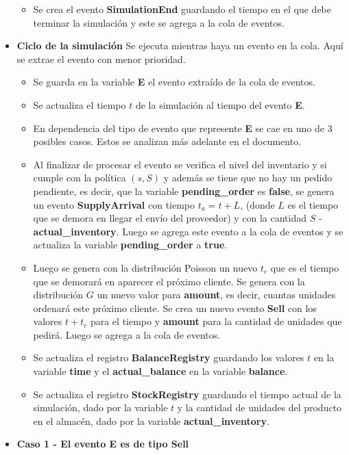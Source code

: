 \documentclass{article}
\begin{document}
\begin{itemize}
\begin{itemize}
        \item Se crea el evento \textbf{SimulationEnd} guardando el tiempo en el que debe terminar la simulación y este se agrega a la cola de eventos.
    \end{itemize}
    \item \textbf{Ciclo de la simulación} Se ejecuta mientras haya un evento en la cola. Aquí se extrae el evento con menor prioridad.
    \begin{itemize}
        \item Se guarda en la variable \textbf{E} el evento extraído de la cola de eventos.
        \item Se actualiza el tiempo $t$ de la simulación al tiempo del evento \textbf{E}.
        \item En dependencia del tipo de evento que represente \textbf{E} se cae en uno de 3 posibles casos. Estos se analizan más adelante en el documento.
        \item Al finalizar de procesar el evento se verifica el nivel del inventario y si cumple con la política $(s,S)$ y además se tiene que no hay un pedido pendiente, es decir, que la variable \textbf{pending\_order} es \textbf{false}, se genera un evento \textbf{SupplyArrival} con tiempo $t_a = t + L$, (donde $L$ es el tiempo que se demora en llegar el envío del proveedor) y con la cantidad $S$ - \textbf{actual\_inventory}. Luego se agrega este evento a la cola de eventos y se actualiza la variable \textbf{pending\_order} a \textbf{true}.
        \item Luego se genera con la distribución Poisson un nuevo $t_c$ que es el tiempo que se demorará en aparecer el próximo cliente. Se genera con la distribución $G$ un nuevo valor para \textbf{amount}, es decir, cuantas unidades ordenará este próximo cliente. Se crea un nuevo evento \textbf{Sell} con los valores $t + t_c$ para el tiempo y \textbf{amount} para la cantidad de unidades que pedirá. Luego se agrega a la cola de eventos.
        \item Se actualiza el registro \textbf{BalanceRegistry} guardando los valores $t$ en la variable \textbf{time} y el \textbf{actual\_balance} en la variable \textbf{balance}.
        \item Se actualiza el registro \textbf{StockRegistry} guardando el tiempo actual de la simulación, dado por la variable $t$ y la cantidad de unidades del producto en el almacén, dado por la variable \textbf{actual\_inventory}.
    \end{itemize}
    \item \textbf{Caso 1 - El evento E es de tipo Sell}

\end{itemize}
\end{document}
